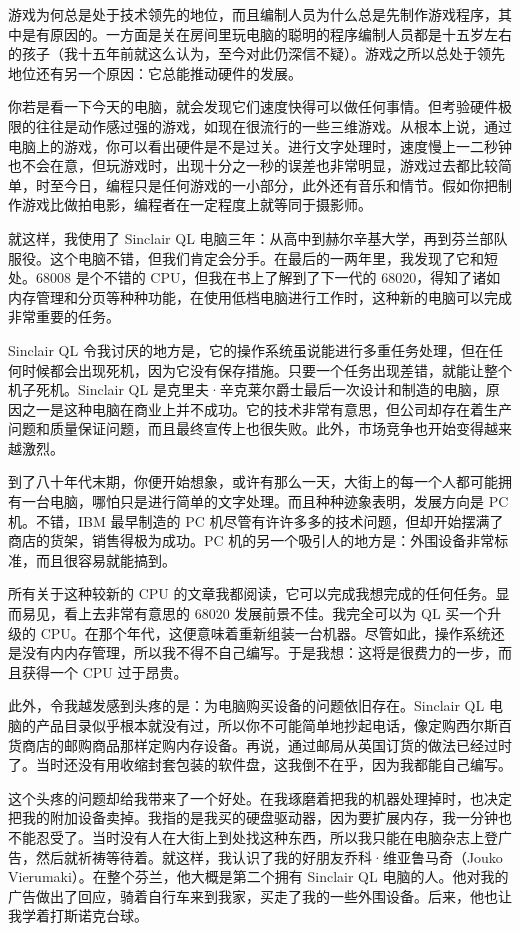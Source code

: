 游戏为何总是处于技术领先的地位，而且编制人员为什么总是先制作游戏程序，其中是有原因的。一方面是关在房间里玩电脑的聪明的程序编制人员都是十五岁左右的孩子（我十五年前就这么认为，至今对此仍深信不疑）。游戏之所以总处于领先地位还有另一个原因：它总能推动硬件的发展。

你若是看一下今天的电脑，就会发现它们速度快得可以做任何事情。但考验硬件极限的往往是动作感过强的游戏，如现在很流行的一些三维游戏。从根本上说，通过电脑上的游戏，你可以看出硬件是不是过关。进行文字处理时，速度慢上一二秒钟也不会在意，但玩游戏时，出现十分之一秒的误差也非常明显，游戏过去都比较简单，时至今日，编程只是任何游戏的一小部分，此外还有音乐和情节。假如你把制作游戏比做拍电影，编程者在一定程度上就等同于摄影师。

就这样，我使用了 Sinclair QL 电脑三年：从高中到赫尔辛基大学，再到芬兰部队服役。这个电脑不错，但我们肯定会分手。在最后的一两年里，我发现了它和短处。68008 是个不错的 CPU，但我在书上了解到了下一代的 68020，得知了诸如内存管理和分页等种种功能，在使用低档电脑进行工作时，这种新的电脑可以完成非常重要的任务。

Sinclair QL 令我讨厌的地方是，它的操作系统虽说能进行多重任务处理，但在任何时候都会出现死机，因为它没有保存措施。只要一个任务出现差错，就能让整个机子死机。Sinclair QL 是克里夫·辛克莱尔爵士最后一次设计和制造的电脑，原因之一是这种电脑在商业上并不成功。它的技术非常有意思，但公司却存在着生产问题和质量保证问题，而且最终宣传上也很失败。此外，市场竞争也开始变得越来越激烈。

到了八十年代末期，你便开始想象，或许有那么一天，大街上的每一个人都可能拥有一台电脑，哪怕只是进行简单的文字处理。而且种种迹象表明，发展方向是 PC 机。不错，IBM 最早制造的 PC 机尽管有许许多多的技术问题，但却开始摆满了商店的货架，销售得极为成功。PC 机的另一个吸引人的地方是：外围设备非常标准，而且很容易就能搞到。

所有关于这种较新的 CPU 的文章我都阅读，它可以完成我想完成的任何任务。显而易见，看上去非常有意思的 68020 发展前景不佳。我完全可以为 QL 买一个升级的 CPU。在那个年代，这便意味着重新组装一台机器。尽管如此，操作系统还是没有内内存管理，所以我不得不自己编写。于是我想：这将是很费力的一步，而且获得一个 CPU 过于昂贵。

此外，令我越发感到头疼的是：为电脑购买设备的问题依旧存在。Sinclair QL 电脑的产品目录似乎根本就没有过，所以你不可能简单地抄起电话，像定购西尔斯百货商店的邮购商品那样定购内存设备。再说，通过邮局从英国订货的做法已经过时了。当时还没有用收缩封套包装的软件盘，这我倒不在乎，因为我都能自己编写。

这个头疼的问题却给我带来了一个好处。在我琢磨着把我的机器处理掉时，也决定把我的附加设备卖掉。我指的是我买的硬盘驱动器，因为要扩展内存，我一分钟也不能忍受了。当时没有人在大街上到处找这种东西，所以我只能在电脑杂志上登广告，然后就祈祷等待着。就这样，我认识了我的好朋友乔科·维亚鲁马奇（Jouko Vierumaki）。在整个芬兰，他大概是第二个拥有 Sinclair QL 电脑的人。他对我的广告做出了回应，骑着自行车来到我家，买走了我的一些外围设备。后来，他也让我学着打斯诺克台球。

